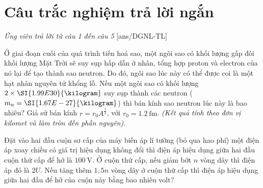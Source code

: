 \section{Câu trắc nghiệm trả lời ngắn} 
\textit{Ứng viên trả lời từ câu 1 đến câu 5}
\setcounter{ex}{0}
[ans/DGNL-TL]
\begin{ex}
	Ở giai đoạn cuối của quá trình tiến hoá sao, một ngôi sao có khối lượng gấp đôi khối lượng Mặt Trời sẽ suy sụp hấp dẫn ở nhân, tổng hợp proton và electron của nó lại để tạo thành sao neutron. Do đó, ngôi sao lúc này có thể được coi là một hạt nhân nguyên tử khổng lồ. Nếu một ngôi sao có khối lượng $2\times\SI{1.99E30}{\kilogram}$ suy sụp thành các neutron ($m_n=\SI{1.67E-27}{\kilogram}$)  thì bán kính sao neutron lúc này là bao nhiêu? Giả sử bán kính $r=r_0A^{\frac{1}{3}}$, với $r_0=\SI{1.2}{\femto\meter}$. \textit{(Kết quả tính theo đơn vị kilomet và làm tròn đến phần nguyên)}.
\end{ex}
\begin{ex}
	Đặt vào hai đầu cuộn sơ cấp của máy biến áp lí tưởng (bỏ qua hao phí) một điện áp xoay chiều có giá trị hiệu dụng không đổi thì điện áp hiệu dụng giữa hai đầu cuộn thứ cấp để hở là $\SI{100}{\volt}$. Ở cuộn thứ cấp, nếu giảm bớt $n$ vòng dây thì điện áp đó là $2U$. Nếu tăng thêm $1,5n$ vòng dây ở cuộn thứ cấp thì điện áp hiệu dụng giữa hai đầu để hở của cuộn này bằng bao nhiêu volt?
\end{ex}
